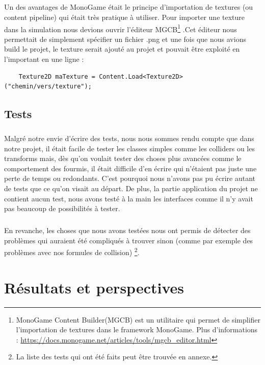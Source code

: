 \documentclass{EPUProjetDi}
\begin{document}
\paragraph{}
Un des avantages de MonoGame était le principe d'importation de textures (ou content pipeline) qui était très pratique à utiliser. Pour importer une texture dans la simulation nous devions ouvrir l'éditeur 
MGCB\footnote{MonoGame Content Builder(MGCB) est un utilitaire qui permet de simplifier l'importation de textures dans le framework MonoGame. Plus d'informations : \url{https://docs.monogame.net/articles/tools/mgcb_editor.html}}
.Cet éditeur nous permettait de simplement spécifier un fichier .png et une fois que nous avions build le projet, le texture serait ajouté au projet et pouvait être exploité en l'important en une ligne : 
\begin{verbatim}
    Texture2D maTexture = Content.Load<Texture2D>("chemin/vers/texture");
\end{verbatim}

\section{Tests}

\paragraph{}
Malgré notre envie d'écrire des tests, nous nous sommes rendu compte que dans notre projet, il était facile de tester les classes simples comme les colliders ou les transforms
mais, dès qu'on voulait tester des choses plus avancées comme le comportement des fourmis, il était difficile d'en écrire qui n'étaient pas juste une perte de temps ou redondants.
C'est pourquoi nous n'avons pas pu écrire autant de tests que ce qu'on visait au départ. De plus, la partie application du projet ne contient aucun test, nous avons testé à la main les interfaces comme il n'y
avait pas beaucoup de possibilités à tester.

\paragraph{}
En revanche, les choses que nous avons testées nous ont permis de détecter des problèmes qui auraient été compliqués à trouver sinon (comme par exemple des problèmes avec nos formules de collision)
\footnote{La liste des tests qui ont été faits peut être trouvée en annexe.}.

\chapter{Résultats et perspectives}
\end{document}
